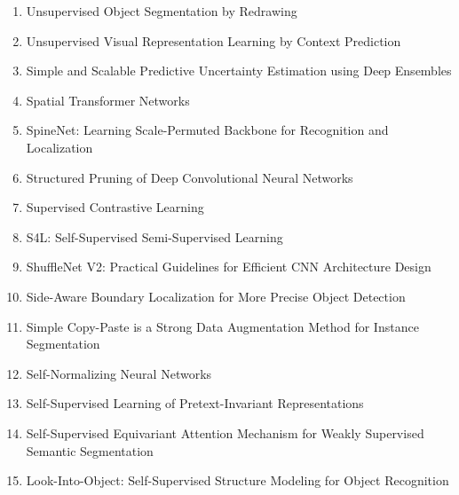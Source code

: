\documentclass[acmlarge]{acmart}
\begin{document}
\begin{enumerate}
	\item Unsupervised Object Segmentation by Redrawing \cite{Chen2019UnsupervisedOS} 

	\item Unsupervised Visual Representation Learning by Context Prediction \cite{Doersch2015UnsupervisedVR} 

	\item Simple and Scalable Predictive Uncertainty Estimation using Deep Ensembles \cite{Lakshminarayanan2017SimpleAS} 

	\item Spatial Transformer Networks \cite{Jaderberg2015SpatialTN} 

	\item SpineNet: Learning Scale-Permuted Backbone for Recognition and Localization \cite{Du2020SpineNetLS} 

	\item Structured Pruning of Deep Convolutional Neural Networks \cite{Anwar2017StructuredPO} 

	\item Supervised Contrastive Learning \cite{Khosla2020SupervisedCL} 

	\item S4L: Self-Supervised Semi-Supervised Learning \cite{Zhai2019S4LSS} 

	\item ShuffleNet V2: Practical Guidelines for Efficient CNN Architecture Design \cite{Ma2018ShuffleNetVP} 

	\item Side-Aware Boundary Localization for More Precise Object Detection \cite{Wang2020SideAwareBL} 

	\item Simple Copy-Paste is a Strong Data Augmentation Method for Instance Segmentation \cite{Ghiasi2021SimpleCI} 

	\item Self-Normalizing Neural Networks \cite{Klambauer2017SelfNormalizingNN} 

	\item Self-Supervised Learning of Pretext-Invariant Representations \cite{Misra2020SelfSupervisedLO} 

	\item Self-Supervised Equivariant Attention Mechanism for Weakly Supervised Semantic Segmentation \cite{Wang2020SelfSupervisedEA} 

	\item Look-Into-Object: Self-Supervised Structure Modeling for Object Recognition \cite{Zhou2020LookIntoObjectSS} 


\end{enumerate}
\end{document}
